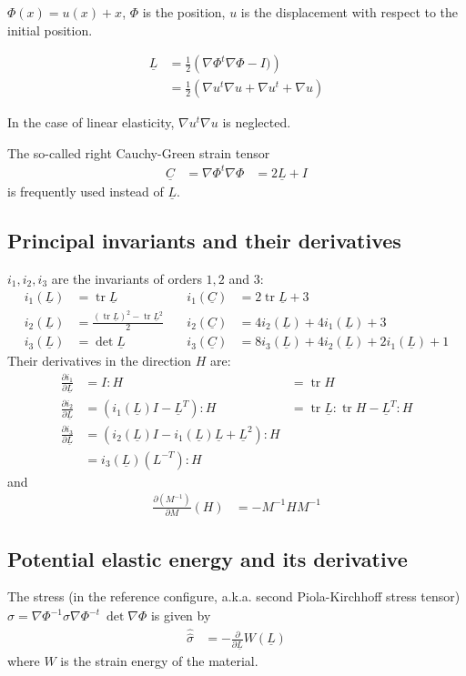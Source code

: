 \documentclass{article}
\newcommand{\TL}{\ensuremath{\underline{L}}}
\newcommand{\TC}{\ensuremath{\underline{C}}}
\newcommand{\DU}{\ensuremath{\nabla u}}
\newcommand{\DUt}{\ensuremath{\nabla u^t}}
\newcommand{\TS}{\ensuremath{\hat{\hat{\sigma}}}}
\newcommand{\Wlaw}{\ensuremath{W}}
\DeclareMathOperator{\Det}{det}
\DeclareMathOperator{\Trace}{tr}
\begin{document}
$\Phi(x) = u(x) + x$, $\Phi$ is the position, $u$ is the displacement with respect to the initial position.

\begin{align}
\TL &= \frac{1}{2}\left(\nabla\Phi^t\nabla\Phi - I)\right)\\
&= \frac{1}{2}\left(\DUt\DU + \DUt + \DU\right)
\end{align}

In the case of linear elasticity, $\DUt\DU$ is neglected.

The so-called right Cauchy-Green strain tensor
\begin{align}
\TC &= \nabla\Phi^t\nabla\Phi &= 2\TL + I
\end{align}
is frequently used instead of $\TL$.

\subsection{Principal invariants and their derivatives}
$i_1,i_2,i_3$ are the invariants of orders $1,2$ and $3$:
\begin{align}
  i_1(\TL) &= \Trace\TL &i_1(\TC) &= 2\Trace\TL + 3\\
  i_2(\TL) &= \frac{(\Trace\TL)^2 - \Trace\TL^2}{2}\quad& i_2(\TC)&=4i_2(\TL)+4i_1(\TL)+3\\
  i_3(\TL) &= \Det\TL &i_3(\TC) &= 8i_3(\TL) + 4i_2(\TL) + 2i_1(\TL) + 1
\end{align}
Their derivatives in the direction $H$ are:
\begin{align}
  \frac{\partial i_1}{\partial\TL} &= I:H &= \Trace H\\
  \frac{\partial i_2}{\partial\TL} &= (i_1(\TL)I - \TL^T):H &= \Trace \TL:\Trace H - \TL^T:H\\
  \frac{\partial i_3}{\partial\TL} &= (i_2(\TL)I - i_1(\TL)\TL + \TL^2):H \\
                  &= i_3(\TL)(L^{-T}):H
\end{align}
and
\begin{align}
\frac{\partial (M^{-1})}{\partial M}(H) &= -M^{-1}HM^{-1}
\end{align}

\subsection{Potential elastic energy and its derivative}

The stress (in the reference configure, a.k.a. second Piola-Kirchhoff stress tensor) $\TS = \nabla\Phi^{-1}\sigma\nabla\Phi^{-t}~\Det \nabla\Phi$ is given by
\begin{align}
  \TS &= -\frac{\partial}{\partial\TL} \Wlaw(\TL)
\end{align}
where $\Wlaw$ is the strain energy of the material.
\end{document}

